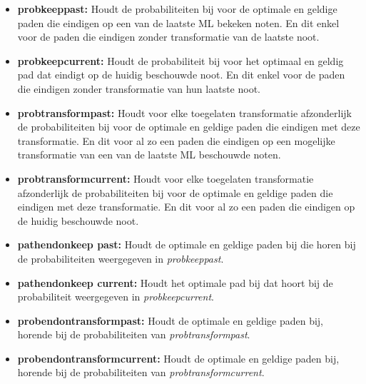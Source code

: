 \begin{itemize}
    \item \textbf{prob\textunderscore keep\textunderscore past:} Houdt de probabiliteiten bij voor de optimale 	en geldige paden die eindigen op een van de laatste ML bekeken noten. En dit 		enkel voor de paden die eindigen zonder transformatie van de laatste noot.
    \item \textbf{prob\textunderscore keep\textunderscore current:} Houdt de probabiliteit bij voor het optimaal en geldig pad dat eindigt op de huidig beschouwde noot. En dit enkel voor de paden die eindigen zonder transformatie van hun laatste noot.
    \item \textbf{prob\textunderscore transform\textunderscore past:} Houdt voor elke toegelaten transformatie afzonderlijk de probabiliteiten bij voor de optimale en geldige paden die eindigen met deze transformatie. En dit voor al zo een paden die eindigen op een mogelijke transformatie van een van de laatste ML beschouwde noten.
    \item \textbf{prob\textunderscore transform\textunderscore current:} Houdt voor elke toegelaten transformatie afzonderlijk de probabiliteiten bij voor de optimale en geldige paden die eindigen met deze transformatie. En dit voor al zo een paden die eindigen op de huidig beschouwde noot.
    \item \textbf{path\textunderscore end\textunderscore on\textunderscore keep \textunderscore past:} Houdt de optimale en geldige paden bij die horen bij de probabiliteiten weergegeven in \textit{prob\textunderscore keep\textunderscore past}.
    \item \textbf{path\textunderscore end\textunderscore on\textunderscore keep \textunderscore current:} Houdt het optimale pad bij dat hoort bij de probabiliteit weergegeven in \textit{prob\textunderscore keep\textunderscore current}.
    \item \textbf{prob\textunderscore end\textunderscore on\textunderscore transform\textunderscore past:} Houdt de optimale en geldige paden bij, horende bij de probabiliteiten van \textit{prob\textunderscore transform\textunderscore past}.
    \item \textbf{prob\textunderscore end\textunderscore on\textunderscore transform\textunderscore current:} Houdt de optimale en geldige paden bij, horende bij de probabiliteiten van \textit{prob\textunderscore transform\textunderscore current}.
\end{itemize}

